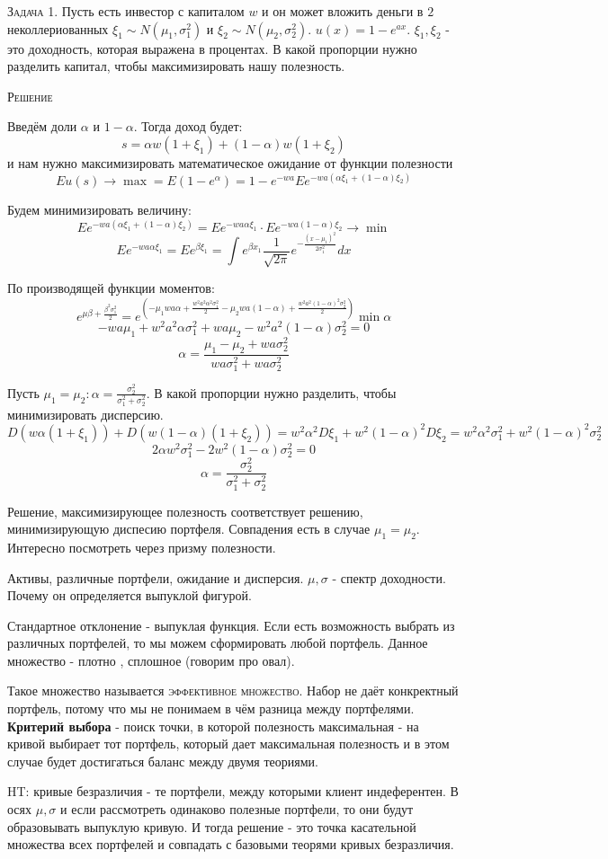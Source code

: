 \documentclass[%
12pt, %
final, %
oneside, %
onecolumn, %
centertags]{article} %
\theoremstyle{plain}
\theoremstyle{definition}
\theoremstyle{remark}
\begin{document}
\textsc{Задача 1.}
Пусть есть инвестор с капиталом $w$ и он может вложить деньги в $2$ неколлериованных $\xi_1 \sim N(\mu_1,\sigma_1^2)$ и $\xi_2 \sim N(\mu_2,\sigma_2^2)$. $u(x) = 1 - e^{ax}$. $\xi_1,\xi_2$ - это доходность, которая выражена в процентах.  В какой пропорции нужно разделить капитал, чтобы максимизировать нашу полезность.

\textsc{Решение}

Введём доли $\alpha$ и $1-\alpha$. Тогда доход будет:
$$s = \alpha w (1+\xi_1) + (1-\alpha)w(1+\xi_2)$$
и нам нужно максимизировать математическое ожидание от функции полезности
$$Eu(s) \to \max  = E (1-e^{\alpha}) = 1 - e^{-wa}Ee^{-wa(\alpha\xi_1+(1-\alpha)\xi_2)}$$

Будем минимизировать величину:
$$Ee^{-wa(\alpha\xi_1+(1-\alpha)\xi_2)} = Ee^{-wa\alpha\xi_1}\cdot  Ee^{-wa(1-\alpha)\xi_2} \to \min$$
$$Ee^{-wa\alpha\xi_1} = Ee^{\beta \xi_1} = \int\limits e^{\beta x_1}\frac{1}{\sqrt{2\pi}}e^{-\frac{(x-\mu_1)^2}{2\sigma_1^2}}dx$$

По производящей функции моментов:
$$e^{\mu\beta + \frac{\beta^2 \sigma_1^2}{2}} = e^{\left(-\mu_1wa\alpha + \frac{w^2 a^2\alpha^2 \sigma_1^2}{2}-\mu_2wa(1-\alpha) + \frac{w^2 a^2(1-\alpha)^2 \sigma_2^2}{2}\right)} \min \alpha$$
$$-wa\mu_1 + w^2a^2\alpha\sigma_1^2 + wa\mu_2-w^2a^2(1-\alpha)\sigma_2^2 = 0$$
$$\alpha = \frac{\mu_1-\mu_2+wa\sigma_2^2}{wa\sigma_1^2+wa\sigma_2^2}$$

Пусть $\mu_1=\mu_2: \alpha = \frac{\sigma_2^2}{\sigma_1^2+\sigma_2^2}$. В какой пропорции нужно разделить, чтобы минимизировать дисперсию.
$$D(w\alpha(1+\xi_1))+D(w(1-\alpha)(1+\xi_2)) = w^2 \alpha^2 D\xi_1 + w^2 (1-\alpha)^2 D\xi_2 = w^2\alpha^2\sigma_1^2 + w^2(1-\alpha)^2\sigma_2^2$$
$$2\alpha w^2\sigma_1^2 -2w^2(1-\alpha)\sigma_2^2 = 0$$
$$\alpha = \frac{\sigma_2^2}{\sigma_1^2+\sigma_2^2}$$

Решение, максимизирующее полезность соответствует решению, минимизирующую диспесию портфеля. Совпадения есть в случае $\mu_1 = \mu_2$. Интересно посмотреть через призму полезности.

Активы, различные портфели, ожидание и дисперсия. $\mu,\sigma$ - спектр доходности. Почему он определяется выпуклой фигурой.

Стандартное отклонение - выпуклая функция. Если есть возможность выбрать из различных портфелей, то мы можем сформировать любой портфель. Данное множество - плотно , сплошное (говорим про овал). 

Такое множество называется \textsc{эффективное множество}. Набор не даёт конкректный портфель, потому что мы не понимаем в чём разница между портфелями. \textbf{Критерий выбора} - поиск точки, в которой полезность максимальная - на кривой выбирает тот портфель, который дает максимальная полезность и в этом случае будет достигаться баланс между двумя теориями.

\textsc{HT}: кривые безразличия - те портфели, между которыми клиент индеферентен. В осях $\mu,\sigma$ и если рассмотреть одинаково полезные портфели, то они будут образовывать выпуклую кривую. И тогда решение - это точка касательной множества всех портфелей и совпадать с базовыми теорями кривых безразличия.
\end{document}
